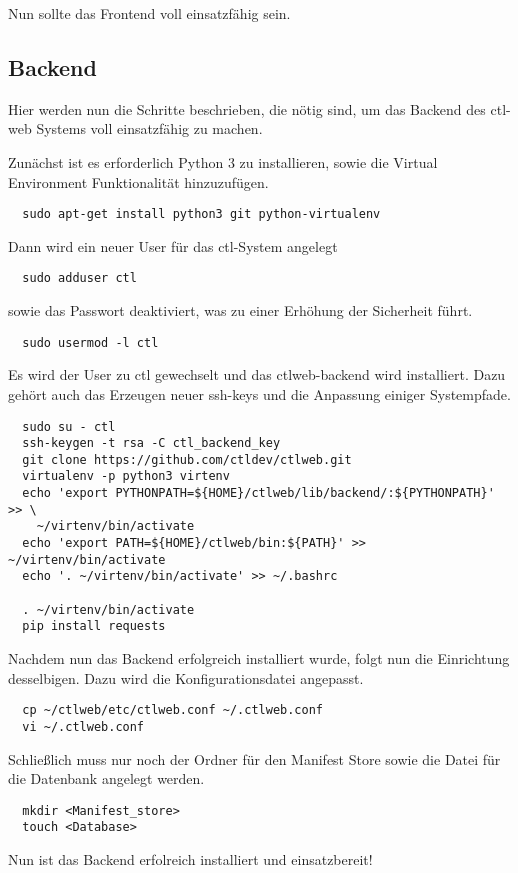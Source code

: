 Nun sollte das Frontend voll einsatzfähig sein.
\subsection{Backend}
Hier werden nun die Schritte beschrieben, die nötig sind, um das Backend des
ctl-web Systems voll einsatzfähig zu machen.

Zunächst ist es erforderlich Python 3 zu installieren, sowie die Virtual
Environment Funktionalität hinzuzufügen.
\begin{lstlisting}
  sudo apt-get install python3 git python-virtualenv
\end{lstlisting}
Dann wird ein neuer User für das ctl-System angelegt
\begin{lstlisting}
  sudo adduser ctl
\end{lstlisting}
sowie das Passwort deaktiviert, was zu einer Erhöhung der Sicherheit führt.
\begin{lstlisting}
  sudo usermod -l ctl
\end{lstlisting}
Es wird der User zu ctl gewechselt und das ctlweb-backend wird installiert.
Dazu gehört auch das Erzeugen neuer ssh-keys und die Anpassung einiger
Systempfade.
\begin{lstlisting}
  sudo su - ctl
  ssh-keygen -t rsa -C ctl_backend_key
  git clone https://github.com/ctldev/ctlweb.git
  virtualenv -p python3 virtenv
  echo 'export PYTHONPATH=${HOME}/ctlweb/lib/backend/:${PYTHONPATH}' >> \
    ~/virtenv/bin/activate
  echo 'export PATH=${HOME}/ctlweb/bin:${PATH}' >> ~/virtenv/bin/activate
  echo '. ~/virtenv/bin/activate' >> ~/.bashrc

  . ~/virtenv/bin/activate
  pip install requests
\end{lstlisting}

Nachdem nun das Backend erfolgreich installiert wurde, folgt nun die
Einrichtung desselbigen. Dazu wird die Konfigurationsdatei angepasst.
\begin{lstlisting}
  cp ~/ctlweb/etc/ctlweb.conf ~/.ctlweb.conf
  vi ~/.ctlweb.conf
\end{lstlisting}

Schließlich muss nur noch der Ordner für den Manifest Store sowie die Datei für
die Datenbank angelegt werden.
\begin{lstlisting}
  mkdir <Manifest_store>
  touch <Database>
\end{lstlisting}

Nun ist das Backend erfolreich installiert und einsatzbereit!


